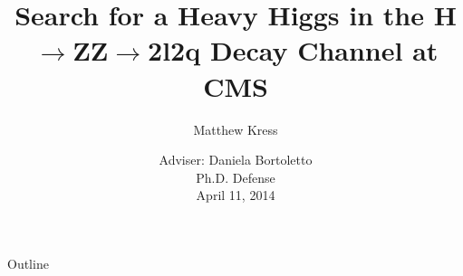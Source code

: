 \documentclass{beamer}
\title[H$\rightarrow$ZZ$\rightarrow$2l2q] %
{Search for a Heavy Higgs in the H$\rightarrow$ZZ$\rightarrow$2l2q Decay Channel at CMS}
\author[Matthew Kress] %
{Matthew Kress}
\institute[Purdue University] %
\date[April 11, 2014] %
{Adviser: Daniela Bortoletto
\\

Ph.D. Defense
\\
April 11, 2014
}
\begin{document}
\begin{frame}
  \titlepage
\end{frame}

\begin{frame}{Outline}
  \tableofcontents
\end{frame}




\end{document}
